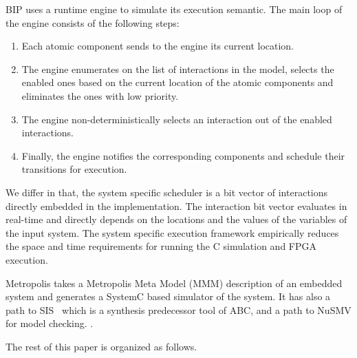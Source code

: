 BIP uses a runtime engine to simulate its execution semantic. 
The main loop of the engine consists of the following steps:
\begin{enumerate}
\item Each atomic component sends to the engine its current location.
\item The engine enumerates on the list of interactions in the model, selects the enabled ones based on the current location of the atomic components and eliminates the ones with low priority.
\item The engine non-deterministically selects an interaction out of the enabled interactions.
\item Finally, the engine notifies the corresponding components and schedule their transitions for execution. 
\end{enumerate}
We differ in that, the system specific scheduler is a bit vector of interactions directly embedded in the implementation. The interaction bit vector evaluates in real-time 
and directly depends on the locations and the values of the variables of the input system. The system specific execution framework empirically reduces the space and time requirements for running the C simulation and FPGA execution. 

Metropolis takes a Metropolis Meta Model (MMM) description of an embedded system and 
generates a SystemC based simulator of the system. It has also a path to 
SIS~\cite{brayton92sis} which is a synthesis predecessor tool of ABC, and a path 
to NuSMV for model checking. 
. 

The rest of this paper is organized as follows.
